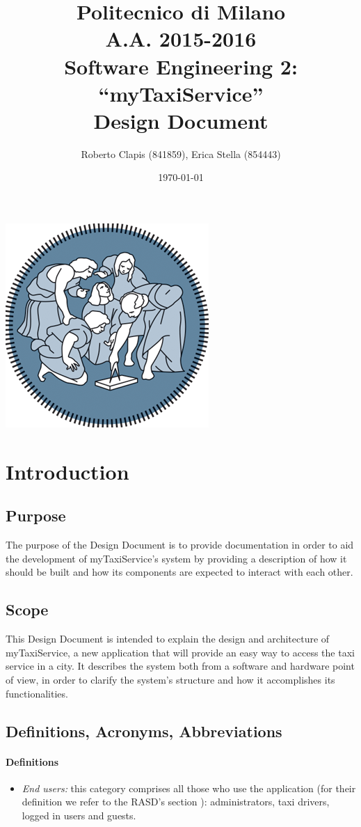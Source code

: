 \documentclass{article}
\author{Roberto Clapis (841859), Erica Stella (854443)}
\date{\today}
\title{Politecnico di Milano
		\\A.A. 2015\@-\@2016
		\\Software Engineering 2: ``myTaxiService''
		\\\textbf{D}esign \textbf{D}ocument}
\begin{document}
\maketitle
\begin{center}
	\includegraphics{polimi-logo}
\end{center}
\clearpage
\tableofcontents
\clearpage

\section{Introduction}
\subsection{Purpose}
The purpose of the Design Document is to provide documentation in order to aid the development of myTaxiService's system by providing a description of how it should be built and how its components are expected to interact with each other.
\subsection{Scope}
This Design Document is intended to explain the design and architecture of myTaxiService, a new application that will provide an easy way to access the taxi service in a city. It describes the system both from a software and hardware point of view, in order to clarify the system's structure and how it accomplishes its functionalities. 
\subsection{Definitions, Acronyms, Abbreviations}
\paragraph{Definitions}
\begin{itemize}
	\item \textit{End users:} this category comprises all those who use the application (for their definition we refer to the RASD's section %
	): administrators, taxi drivers, logged in users and guests.
\end{itemize}
\end{document}
